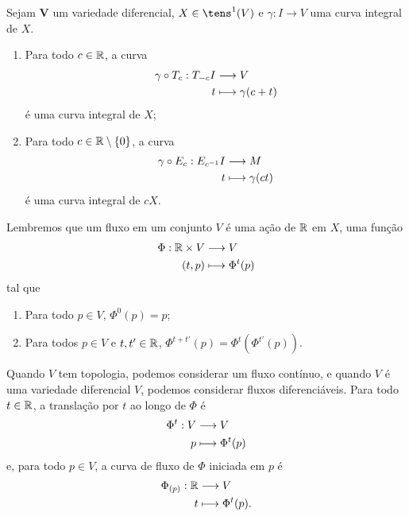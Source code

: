 \begin{prop}
Sejam $\bm V$ um variedade diferencial, $X \in \tens^1(V)$ e $\gamma\colon I \to V$ uma curva integral de $X$.
	\begin{enumerate}
	\item Para todo $c \in \mathbb{R}$, a curva
		\begin{align*}
		{\gamma \circ T_c}: {T_{-c} I} &\longrightarrow {V} \\{t} &\longmapsto {\gamma(c+t)}
		\end{align*}
é uma curva integral de $X$;
	
	\item Para todo $c \in \mathbb{R} \setminus \{0\}$, a curva
		\begin{align*}
		{\gamma \circ E_c}: {E_{c^{-1}} I} &\longrightarrow {M} \\{t} &\longmapsto {\gamma(ct)}
		\end{align*}
é uma curva integral de $cX$.
	\end{enumerate}
\end{prop}

Lembremos que um fluxo em um conjunto $V$ é uma ação de $\mathbb{R}$ em $X$, uma função
	\begin{align*}
	{\Phi}: {\mathbb{R} \times V} &\longrightarrow {V} \\{(t,p)} &\longmapsto {\Phi^t(p)}
	\end{align*}
tal que
	\begin{enumerate}
	\item Para todo $p \in V$, $\Phi^0(p) = p$;
	\item Para todos $p \in V$ e $t,t' \in \mathbb{R}$, $\Phi^{t+t'}(p) = \Phi^t(\Phi^{t'}(p))$.
	\end{enumerate}

Quando $V$ tem topologia, podemos considerar um fluxo contínuo, e quando $V$ é uma variedade diferencial $V$, podemos considerar fluxos diferenciáveis. Para todo $t \in \mathbb{R}$, a translação por $t$ ao longo de $\Phi$ é
	\begin{align*}
	{\Phi^t}: {V} &\longrightarrow {V} \\{p} &\longmapsto {\Phi^t(p)}
	\end{align*}
e, para todo $p \in V$, a curva de fluxo de $\Phi$ iniciada em $p$ é
	\begin{align*}
	{\Phi_{(p)}}: {\mathbb{R}} &\longrightarrow {V} \\{t} &\longmapsto {\Phi^t(p)}.
	\end{align*}

